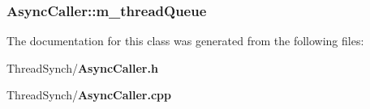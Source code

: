 \subsubsection{ {\bf Async\-Caller::m\_\-thread\-Queue}\hspace{0.3cm}{\tt  [private]}}\label{class_async_caller_cef4c0944fd719b0d161c591f3a77062}




The documentation for this class was generated from the following files:\begin{CompactItemize}
\item 
Thread\-Synch/{\bf Async\-Caller.h}\item 
Thread\-Synch/{\bf Async\-Caller.cpp}\end{CompactItemize}
